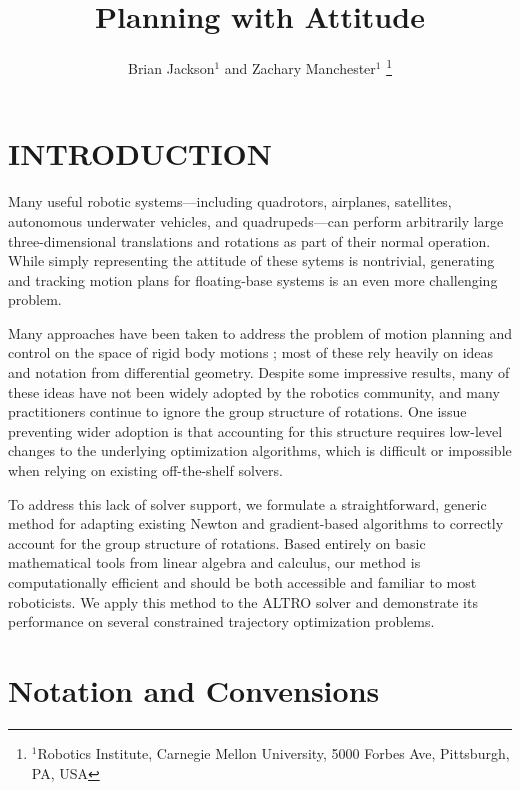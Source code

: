 \documentclass[letterpaper, 10 pt, conference]{ieeeconf}  %
\title{\LARGE \bf
Planning with Attitude
}
\author{Brian Jackson$^1$ and Zachary Manchester$^1$%
    \thanks{
        $^1$Robotics Institute, 
        Carnegie Mellon University, 
        5000 Forbes Ave, Pittsburgh, PA, USA
    }
}
\newcommand{\todo}[1]{\textcolor{red}{TODO: #1}}
\begin{document}
\maketitle

\section{INTRODUCTION} 

    Many useful robotic systems---including quadrotors, airplanes, satellites, autonomous
    underwater vehicles, and quadrupeds---can perform arbitrarily large three-dimensional
    translations and rotations as part of their normal operation. While simply
    representing the attitude of these sytems is nontrivial, generating and tracking
    motion plans for floating-base systems is an even more challenging problem.

    Many approaches have been taken to address the problem of motion planning and control
    on the space of rigid body motions \cite{Kobilarov2011, Saccon2013,
    watterson2020control}; most of these rely heavily on ideas and notation from
    differential geometry. Despite some impressive results, many of these ideas have not
    been widely adopted by the robotics community, and many practitioners continue to
    ignore the group structure of rotations. One issue preventing wider adoption is that
    accounting for this structure requires low-level changes to the underlying
    optimization algorithms, which is difficult or impossible when relying on existing
    off-the-shelf solvers.
    

    To address this lack of solver support, we formulate a straightforward, generic method for adapting
    existing Newton and gradient-based algorithms to correctly account for the group structure of
    rotations. Based entirely on basic mathematical tools from linear algebra and
    calculus, our method is computationally efficient and should be both accessible and
    familiar to most roboticists. We apply this method to the ALTRO solver
    \cite{howell2019altro} and demonstrate its performance on several constrained trajectory
    optimization problems.

\section{Notation and Convensions}
\end{document}

